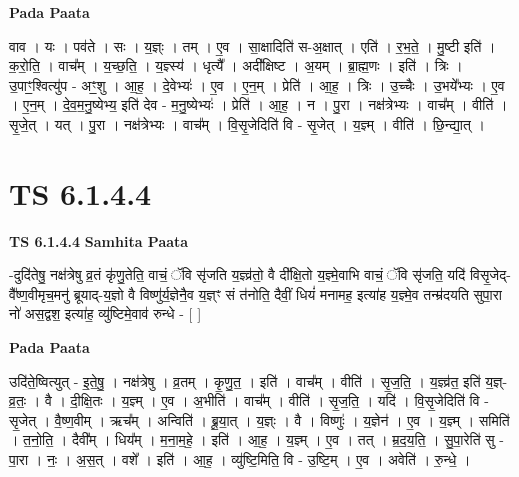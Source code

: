 \documentclass[17pt]{extarticle}
\begin{document}
\textbf{Pada Paata} \newline

वाव । यः । पव॑ते । सः । य॒ज्ञ्ः । तम् । ए॒व । सा॒क्षादिति॑ स-अ॒क्षात् । एति॑ । र॒भ॒ते॒ । मु॒ष्टी इति॑ । क॒रो॒ति॒ । वाच᳚म् । य॒च्छ॒ति॒ । य॒ज्ञ्स्य॑ । धृत्यै᳚ । अदी᳚क्षिष्ट । अ॒यम् । ब्रा॒ह्म॒णः । इति॑ । त्रिः । उ॒पाꣳ॒॒श्वित्यु॑प - अꣳ॒॒शु । आ॒ह॒ । दे॒वेभ्यः॑ । ए॒व । ए॒न॒म् । प्रेति॑ । आ॒ह॒ । त्रिः । उ॒च्चैः । उ॒भये᳚भ्यः । ए॒व । ए॒न॒म् । दे॒व॒म॒नु॒ष्येभ्य॒ इति॑ देव - म॒नु॒ष्येभ्यः॑ । प्रेति॑ । आ॒ह॒ । न । पु॒रा । नक्ष॑त्रेभ्यः । वाच᳚म् । वीति॑ । सृ॒जे॒त् । यत् । पु॒रा । नक्ष॑त्रेभ्यः । वाच᳚म् । वि॒सृ॒जेदिति॑ वि - सृ॒जेत् । य॒ज्ञ्म् । वीति॑ । छि॒न्द्या॒त् ।  \newline




\section*{ TS 6.1.4.4 }

\textbf{TS 6.1.4.4 } \newline
\textbf{Samhita Paata} \newline

-दुदि॑तेषु॒ नक्ष॑त्रेषु व्र॒तं कृ॑णु॒तेति॒ वाचं॒ ॅवि सृ॑जति य॒ज्ञ्व्र॑तो॒ वै दी᳚क्षि॒तो य॒ज्ञ्मे॒वाभि वाचं॒ ॅवि सृ॑जति॒ यदि॑ विसृ॒जेद्-वै᳚ष्ण॒वीमृच॒मनु॑ ब्रूयाद्-य॒ज्ञो वै विष्णु॑र्य॒ज्ञेनै॒व य॒ज्ञ्ꣳ सं त॑नोति॒ दैवीं॒ धियं॑ मनामह॒ इत्या॑ह य॒ज्ञ्मे॒व तन्म्र॑दयति सुपा॒रा नो॑ अस॒द्वश॒ इत्या॑ह॒ व्यु॑ष्टिमे॒वाव॑ रुन्धे - [  ] \newline

\textbf{Pada Paata} \newline

उदि॑ते॒ष्वित्युत् - इ॒ते॒षु॒ । नक्ष॑त्रेषु । व्र॒तम् । कृ॒णु॒त॒ । इति॑ । वाच᳚म् । वीति॑ । सृ॒ज॒ति॒ । य॒ज्ञ्व्र॑त॒ इति॑ य॒ज्ञ्-व्र॒तः॒ । वै । दी॒क्षि॒तः । य॒ज्ञ्म् । ए॒व । अ॒भीति॑ । वाच᳚म् । वीति॑ । सृ॒ज॒ति॒ । यदि॑ । वि॒सृ॒जेदिति॑ वि - सृ॒जेत् । वै॒ष्ण॒वीम् । ऋच᳚म् । अन्विति॑ । ब्रू॒या॒त् । य॒ज्ञ्ः । वै । विष्णुः॑ । य॒ज्ञेन॑ । ए॒व । य॒ज्ञ्म् । समिति॑ । त॒नो॒ति॒ । दैवी᳚म् । धिय᳚म् । म॒ना॒म॒हे॒ । इति॑ । आ॒ह॒ । य॒ज्ञ्म् । ए॒व । तत् । म्र॒द॒य॒ति॒ । सु॒पा॒रेति॑ सु - पा॒रा । नः॒ । अ॒स॒त् । वशे᳚ । इति॑ । आ॒ह॒ । व्यु॑ष्टि॒मिति॒ वि - उ॒ष्टि॒म् । ए॒व । अवेति॑ । रु॒न्धे॒ ।  \newline




\end{document}
